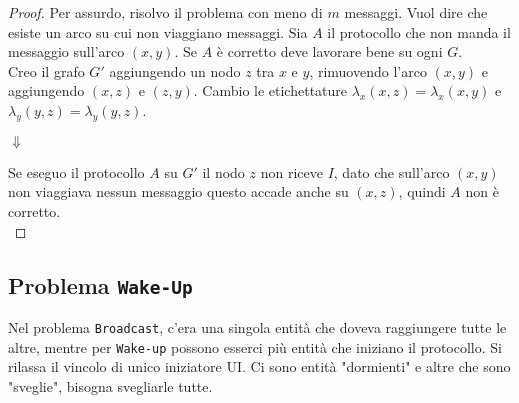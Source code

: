 \begin{proof}
	Per assurdo, risolvo il problema con meno di $m$ messaggi. Vuol dire che esiste un arco su cui non viaggiano messaggi. Sia $A$ il protocollo che non manda il messaggio sull'arco $(x,y)$. Se $A$ è corretto deve lavorare bene su ogni $G$.\\
	
	Creo il grafo $G'$ aggiungendo un nodo $z$ tra $x$ e $y$, rimuovendo l'arco $(x,y)$ e aggiungendo $(x,z)$ e $(z,y)$. Cambio le etichettature $\lambda_x (x,z) = \lambda_x (x,y)$ e $\lambda_y(y,z) = \lambda_y (y,z)$.\\
	
	\begin{center}
		\nn \nn
		$\Downarrow$
		\nn \nn
	\end{center}
	
	Se eseguo il protocollo $A$ su $G'$ il nodo $z$ non riceve $I$, dato che sull'arco $(x,y)$ non viaggiava nessun messaggio questo accade anche su $(x,z)$, quindi $A$ non è corretto.\\
\end{proof}

\newpage

\subsection{Problema \texttt{Wake-Up}}

Nel problema \texttt{Broadcast}, c'era una singola entità che doveva raggiungere tutte le altre, mentre per \texttt{Wake-up} possono esserci più entità che iniziano il protocollo. Si rilassa il vincolo di unico iniziatore UI. Ci sono entità "dormienti" e altre che sono "sveglie", bisogna svegliarle tutte.\\

